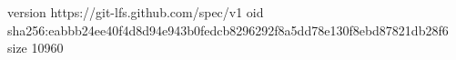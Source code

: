 version https://git-lfs.github.com/spec/v1
oid sha256:eabbb24ee40f4d8d94e943b0fedcb8296292f8a5dd78e130f8ebd87821db28f6
size 10960
